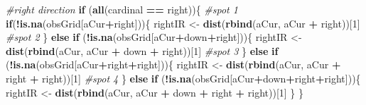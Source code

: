 \documentclass[]{article}
\newenvironment{Shaded}{\begin{snugshade}}{\end{snugshade}}
\newcommand{\CommentTok}[1]{\textcolor[rgb]{0.56,0.35,0.01}{\textit{#1}}}
\newcommand{\ControlFlowTok}[1]{\textcolor[rgb]{0.13,0.29,0.53}{\textbf{#1}}}
\newcommand{\DecValTok}[1]{\textcolor[rgb]{0.00,0.00,0.81}{#1}}
\newcommand{\KeywordTok}[1]{\textcolor[rgb]{0.13,0.29,0.53}{\textbf{#1}}}
\newcommand{\NormalTok}[1]{#1}
\newcommand{\OperatorTok}[1]{\textcolor[rgb]{0.81,0.36,0.00}{\textbf{#1}}}
\newcommand{\StringTok}[1]{\textcolor[rgb]{0.31,0.60,0.02}{#1}}
\begin{document}
\begin{Shaded}
\begin{Highlighting}[]
  \CommentTok{#right direction}
  \ControlFlowTok{if}\NormalTok{ (}\KeywordTok{all}\NormalTok{(cardinal }\OperatorTok{==}\StringTok{ }\NormalTok{right))\{}
    \CommentTok{#spot 1}
    \ControlFlowTok{if}\NormalTok{(}\OperatorTok{!}\KeywordTok{is.na}\NormalTok{(obsGrid[aCur}\OperatorTok{+}\NormalTok{right]))\{}
\NormalTok{        rightIR <-}\StringTok{ }\KeywordTok{dist}\NormalTok{(}\KeywordTok{rbind}\NormalTok{(aCur, aCur }\OperatorTok{+}\StringTok{ }\NormalTok{right))[}\DecValTok{1}\NormalTok{]}
         \CommentTok{#spot 2}
\NormalTok{    \} }\ControlFlowTok{else} \ControlFlowTok{if}\NormalTok{ (}\OperatorTok{!}\KeywordTok{is.na}\NormalTok{(obsGrid[aCur}\OperatorTok{+}\NormalTok{down}\OperatorTok{+}\NormalTok{right]))\{}
\NormalTok{       rightIR <-}\StringTok{ }\KeywordTok{dist}\NormalTok{(}\KeywordTok{rbind}\NormalTok{(aCur, aCur }\OperatorTok{+}\StringTok{ }\NormalTok{down }\OperatorTok{+}\StringTok{ }\NormalTok{right))[}\DecValTok{1}\NormalTok{]}
       \CommentTok{#spot 3}
\NormalTok{    \} }\ControlFlowTok{else} \ControlFlowTok{if}\NormalTok{ (}\OperatorTok{!}\KeywordTok{is.na}\NormalTok{(obsGrid[aCur}\OperatorTok{+}\NormalTok{right}\OperatorTok{+}\NormalTok{right]))\{}
\NormalTok{    rightIR <-}\StringTok{ }\KeywordTok{dist}\NormalTok{(}\KeywordTok{rbind}\NormalTok{(aCur, aCur }\OperatorTok{+}\StringTok{ }\NormalTok{right }\OperatorTok{+}\StringTok{ }\NormalTok{right))[}\DecValTok{1}\NormalTok{]}
    \CommentTok{#spot 4}
\NormalTok{    \} }\ControlFlowTok{else} \ControlFlowTok{if}\NormalTok{ (}\OperatorTok{!}\KeywordTok{is.na}\NormalTok{(obsGrid[aCur}\OperatorTok{+}\NormalTok{down}\OperatorTok{+}\NormalTok{right}\OperatorTok{+}\NormalTok{right]))\{}
\NormalTok{      rightIR <-}\StringTok{ }\KeywordTok{dist}\NormalTok{(}\KeywordTok{rbind}\NormalTok{(aCur, aCur }\OperatorTok{+}\StringTok{ }\NormalTok{down }\OperatorTok{+}\StringTok{ }\NormalTok{right }\OperatorTok{+}\StringTok{ }\NormalTok{right))[}\DecValTok{1}\NormalTok{]}
\NormalTok{    \}}
\NormalTok{  \}}
  

\end{Highlighting}
\end{Shaded}
\end{document}
